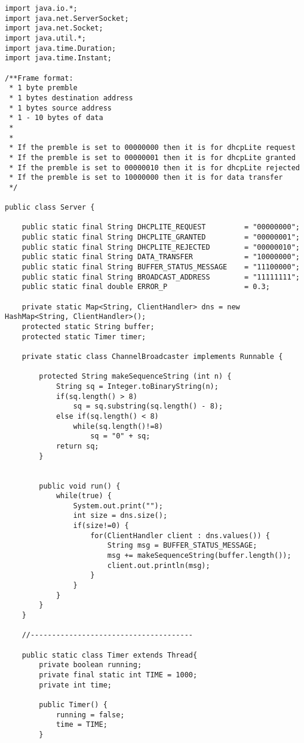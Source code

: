 \begin{verbatim}
import java.io.*;
import java.net.ServerSocket;
import java.net.Socket;
import java.util.*;
import java.time.Duration;
import java.time.Instant;

/**Frame format:
 * 1 byte premble
 * 1 bytes destination address
 * 1 bytes source address
 * 1 - 10 bytes of data
 *
 *
 * If the premble is set to 00000000 then it is for dhcpLite request
 * If the premble is set to 00000001 then it is for dhcpLite granted
 * If the premble is set to 00000010 then it is for dhcpLite rejected
 * If the premble is set to 10000000 then it is for data transfer
 */

public class Server {

	public static final String DHCPLITE_REQUEST 		= "00000000";
	public static final String DHCPLITE_GRANTED 		= "00000001";
	public static final String DHCPLITE_REJECTED 		= "00000010";
	public static final String DATA_TRANSFER 			= "10000000";
	public static final String BUFFER_STATUS_MESSAGE 	= "11100000";
	public static final String BROADCAST_ADDRESS 		= "11111111";
	public static final double ERROR_P 					= 0.3;

	private static Map<String, ClientHandler> dns = new HashMap<String, ClientHandler>();
	protected static String buffer;
	protected static Timer timer;
	
	private static class ChannelBroadcaster implements Runnable {

        protected String makeSequenceString (int n) {
	    	String sq = Integer.toBinaryString(n);
		    if(sq.length() > 8)
				sq = sq.substring(sq.length() - 8);
			else if(sq.length() < 8)
				while(sq.length()!=8)
					sq = "0" + sq;
			return sq;
		}


		public void run() {
			while(true) {
				System.out.print("");
				int size = dns.size();
				if(size!=0) {
					for(ClientHandler client : dns.values()) {
						String msg = BUFFER_STATUS_MESSAGE;
						msg += makeSequenceString(buffer.length());
						client.out.println(msg);
					}
				}
			}
		}
	}

	//--------------------------------------

	public static class Timer extends Thread{
		private boolean running;
		private final static int TIME = 1000;
		private int time;

		public Timer() {
			running = false;
			time = TIME;
		}


\end{verbatim}
